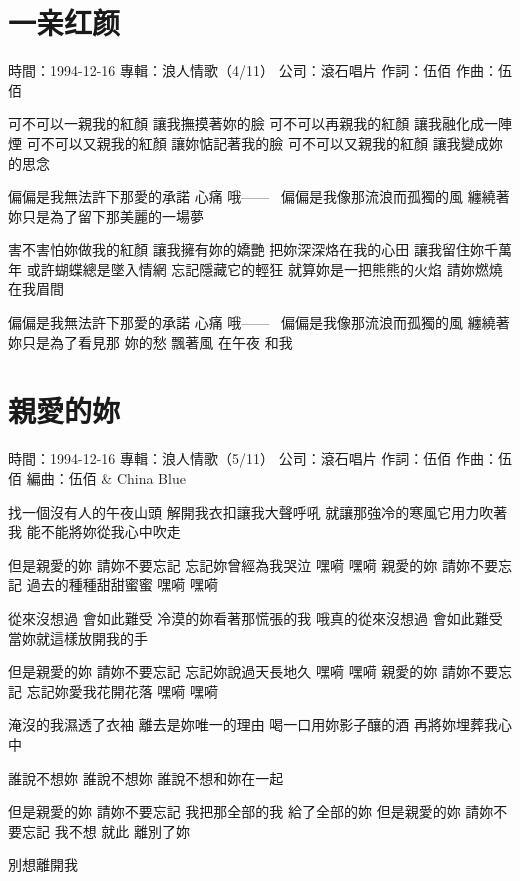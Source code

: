 \documentclass[UTF8,a4paper,oneside,twocolumn,12pt]{ctexbook}
\newcommand{\infopair}[2]{\textbullet #1：#2}
\newcommand{\zc}[1][伍佰]{\infopair{作詞}{#1}}
\newcommand{\zq}[1][伍佰]{\infopair{作曲}{#1}}
\newcommand{\bq}[1][伍佰]{\infopair{編曲}{#1}}
\newcommand{\zj}[1]{\infopair{專輯}{#1}}
\newcommand{\sj}[1]{\infopair{時間}{#1}}
\newcommand{\gs}[1]{\infopair{公司}{#1}}
\newenvironment{info}{\begin{flushleft}\kaishu
	}
	{\end{flushleft}\normalsize\yahei\par}
\newenvironment{lyric}{
	}
{}
\begin{document}
\section{一亲红颜}
\begin{info}
	\sj{1994-12-16}
	\zj{浪人情歌（4/11）}
	\gs{滾石唱片}
	\zc
	\zq
\end{info}
\begin{lyric}
	可不可以一親我的紅顏 讓我撫摸著妳的臉
	可不可以再親我的紅顏 讓我融化成一陣煙
	可不可以又親我的紅顏 讓妳惦記著我的臉
	可不可以又親我的紅顏 讓我變成妳的思念

	偏偏是我無法許下那愛的承諾 心痛 哦——~
	偏偏是我像那流浪而孤獨的風
	纏繞著妳只是為了留下那美麗的一場夢

	害不害怕妳做我的紅顏 讓我擁有妳的嬌艷
	把妳深深烙在我的心田 讓我留住妳千萬年
	或許蝴蝶總是墜入情網 忘記隱藏它的輕狂
	就算妳是一把熊熊的火焰 請妳燃燒在我眉間

	偏偏是我無法許下那愛的承諾 心痛 哦——~
	偏偏是我像那流浪而孤獨的風
	纏繞著妳只是為了看見那
	妳的愁 飄著風 在午夜 和我
\end{lyric}

\section{親愛的妳}
\begin{info}
	\sj{1994-12-16}
	\zj{浪人情歌（5/11）}
	\gs{滾石唱片}
	\zc
	\zq
	\bq[伍佰 \& China Blue]
\end{info}
\begin{lyric}
	找一個沒有人的午夜山頭
	解開我衣扣讓我大聲呼吼
	就讓那強冷的寒風它用力吹著我
	能不能將妳從我心中吹走

	但是親愛的妳 請妳不要忘記
	忘記妳曾經為我哭泣 嘿嗬 嘿嗬
	親愛的妳 請妳不要忘記
	過去的種種甜甜蜜蜜 嘿嗬 嘿嗬

	從來沒想過 會如此難受
	冷漠的妳看著那慌張的我
	哦真的從來沒想過 會如此難受
	當妳就這樣放開我的手

	但是親愛的妳 請妳不要忘記
	忘記妳說過天長地久 嘿嗬 嘿嗬
	親愛的妳 請妳不要忘記
	忘記妳愛我花開花落 嘿嗬 嘿嗬

	淹沒的我濕透了衣袖
	離去是妳唯一的理由
	喝一口用妳影子釀的酒
	再將妳埋葬我心中

	誰說不想妳
	誰說不想妳
	誰說不想和妳在一起

	但是親愛的妳 請妳不要忘記
	我把那全部的我 給了全部的妳
	但是親愛的妳 請妳不要忘記
	我不想 就此 離別了妳

	別想離開我
\end{lyric}
\end{document}
